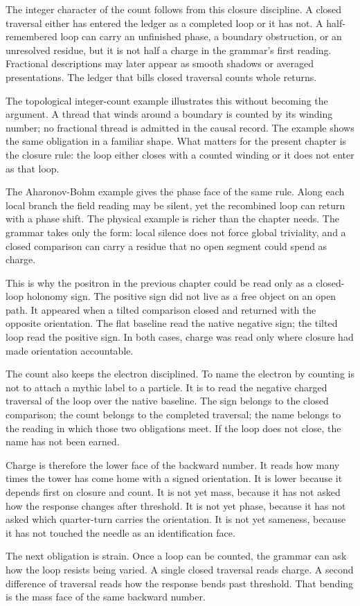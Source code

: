The integer character of the count follows from this closure discipline. A
closed traversal either has entered the ledger as a completed loop or it has
not. A half-remembered loop can carry an unfinished phase, a boundary
obstruction, or an unresolved residue, but it is not half a charge in the
grammar's first reading. Fractional descriptions may later appear as smooth
shadows or averaged presentations. The ledger that bills closed traversal
counts whole returns.

The topological integer-count example illustrates this without becoming the
argument. A thread that winds around a boundary is counted by its winding
number; no fractional thread is admitted in the causal record. The example
shows the same obligation in a familiar shape. What matters for the present
chapter is the closure rule: the loop either closes with a counted winding
or it does not enter as that loop.

The Aharonov-Bohm example gives the phase face of the same rule. Along each
local branch the field reading may be silent, yet the recombined loop can
return with a phase shift. The physical example is richer than the chapter
needs. The grammar takes only the form: local silence does not force global
triviality, and a closed comparison can carry a residue that no open segment
could spend as charge.

This is why the positron in the previous chapter could be read only as a
closed-loop holonomy sign. The positive sign did not live as a free object on
an open path. It appeared when a tilted comparison closed and returned with
the opposite orientation. The flat baseline read the native negative sign;
the tilted loop read the positive sign. In both cases, charge was read only
where closure had made orientation accountable.

The count also keeps the electron disciplined. To name the electron by
counting is not to attach a mythic label to a particle. It is to read the
negative charged traversal of the loop over the native baseline. The sign
belongs to the closed comparison; the count belongs to the completed
traversal; the name belongs to the reading in which those two obligations
meet. If the loop does not close, the name has not been earned.

Charge is therefore the lower face of the backward number. It reads how many
times the tower has come home with a signed orientation. It is lower because
it depends first on closure and count. It is not yet mass, because it has not
asked how the response changes after threshold. It is not yet phase, because
it has not asked which quarter-turn carries the orientation. It is not yet
sameness, because it has not touched the needle as an identification face.

The next obligation is strain. Once a loop can be counted, the grammar can
ask how the loop resists being varied. A single closed traversal reads
charge. A second difference of traversal reads how the response bends past
threshold. That bending is the mass face of the same backward number.
